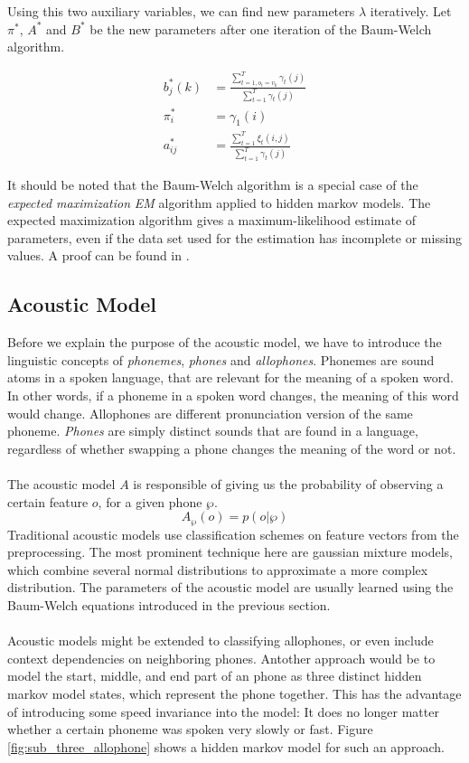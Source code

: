 Using this two auxiliary variables, we can find new parameters $\lambda$ iteratively. Let $\pi^*$, $A^*$ and $B^*$ be the new parameters after one iteration of the Baum-Welch algorithm. 

\begin{align*}
b^*_j(k) &= \frac{\sum_{t = 1, o_t = v_k}^{T} \gamma_t(j)}{\sum_{t = 1}^{T} \gamma_t(j)} \\
\pi^*_i &= \gamma_1(i) \\
a_{ij}^*  &= \frac{\sum_{t = 1}^{T} \xi_t(i, j)}{\sum_{t = 1}^{T} \gamma_t(j)} 
\end{align*}

It should be noted that the Baum-Welch algorithm is a special case of the \textit{expected maximization} {\textit{EM}} algorithm applied to hidden markov models. The expected maximization algorithm gives a maximum-likelihood estimate of parameters, even if the data set used for the estimation has incomplete or missing values. A proof can be found in \cite{bilmes1998gentle}. 

\subsection{Acoustic Model}
\label{sec:acoustic_model}
Before we explain the purpose of the acoustic model, we have to introduce the linguistic concepts of \textit{phonemes}, \textit{phones} and \textit{allophones}. Phonemes are sound atoms in a spoken language, that are relevant for the meaning of a spoken word. In other words, if a phoneme in a spoken word changes, the meaning of this word would change. Allophones are different pronunciation version of the same phoneme. \textit{Phones} are simply distinct sounds that are found in a language, regardless of whether swapping a phone changes the meaning of the word or not. \\ \\
The acoustic model $A$ is responsible of giving us the probability of observing a certain feature $o$, for a given phone $\wp$. 
\[
	A_\wp(o) = p(o|\wp)
\]
Traditional acoustic models use classification schemes on feature vectors from the preprocessing. The most prominent technique here are gaussian mixture models, which combine several normal distributions to approximate a more complex distribution. The parameters of the acoustic model are usually learned using the Baum-Welch equations introduced in the previous section. \\ \\
Acoustic models might be extended to classifying allophones, or even include context dependencies on neighboring phones. Antother approach would be to model the start, middle, and end part of an phone as three distinct hidden markov model states, which represent the phone together. This has the advantage of introducing some speed invariance into the model: It does no longer matter whether a certain phoneme was spoken very slowly or fast. Figure \ref{fig:sub_three_allophone} shows a hidden markov model for such an approach. 

